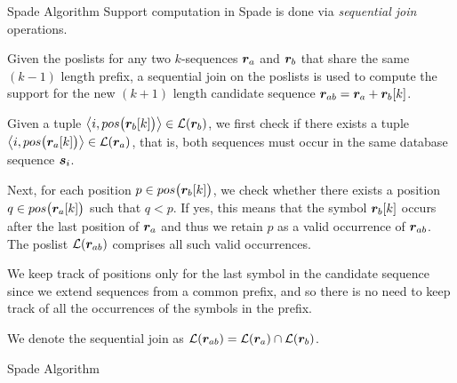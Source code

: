 \begin{frame}{Spade Algorithm}
Support computation in Spade is done via {\em sequential join}
operations.  

\medskip
Given the poslists for any two
$k$-sequences ${\boldsymbol r}_a$ and ${\boldsymbol r}_b$ that share the same $(k-1)$ length
pref\/{i}x, a sequential join on the poslists is used to
compute the support for the new $(k+1)$ length candidate sequence
${\boldsymbol r}_{ab} = {\boldsymbol r}_a + {\boldsymbol r}_b[k]$.  

\medskip 
Given a tuple ${\big\langle i,pos\bigl({\boldsymbol r}_b[k]\bigr) \big\rangle} \in
{\mathcal L}({\boldsymbol r}_b)$, we f\/{i}rst check if there exists a tuple
${\big\langle i,pos\bigl({\boldsymbol r}_a[k]\bigr) \big\rangle} \in {\mathcal L}({\boldsymbol r}_a)$, that is, both
sequences must occur in the same database sequence ${\boldsymbol s}_i$. 

\smallskip
Next, for
each position $p \in pos\bigl({\boldsymbol r}_b[k]\bigr)$, we check whether there
exists a position $q \in pos\bigl({\boldsymbol r}_a[k]\bigr)$ such that $q < p$. If
yes, this means that the symbol ${\boldsymbol r}_b[k]$ occurs after the last
position of ${\boldsymbol r}_a$ and thus we retain $p$ as a valid occurrence of
${\boldsymbol r}_{ab}$. The poslist ${\mathcal L}({\boldsymbol r}_{ab})$ comprises all such valid
occurrences.  

\medskip
We keep track of positions only for the last
symbol in the candidate sequence since we extend sequences
from a common pref\/{i}x, and so there is no need to keep track of all the
occurrences of the symbols in the pref\/{i}x.  

\medskip
We denote the sequential
join as ${\mathcal L}({\boldsymbol r}_{ab}) = {\mathcal L}({\boldsymbol r}_a) \cap {\mathcal L}({\boldsymbol r}_b)$.

\end{frame}


\begin{frame}[fragile]{Spade Algorithm}
\begin{tightalgo}[H]{\textwidth-18pt}
\AlgorithmT{}
\end{tightalgo}
\end{frame}



